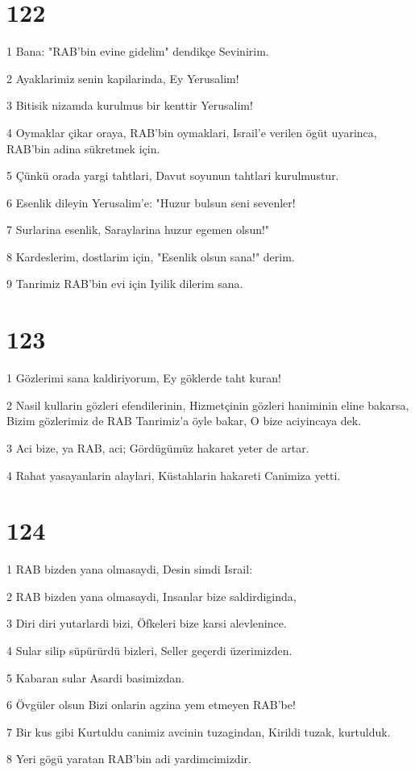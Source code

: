 \chapter{122}

\par 1 Bana: "RAB'bin evine gidelim" dendikçe Sevinirim.
\par 2 Ayaklarimiz senin kapilarinda, Ey Yerusalim!
\par 3 Bitisik nizamda kurulmus bir kenttir Yerusalim!
\par 4 Oymaklar çikar oraya, RAB'bin oymaklari, Israil'e verilen ögüt uyarinca, RAB'bin adina sükretmek için.
\par 5 Çünkü orada yargi tahtlari, Davut soyunun tahtlari kurulmustur.
\par 6 Esenlik dileyin Yerusalim'e: "Huzur bulsun seni sevenler!
\par 7 Surlarina esenlik, Saraylarina huzur egemen olsun!"
\par 8 Kardeslerim, dostlarim için, "Esenlik olsun sana!" derim.
\par 9 Tanrimiz RAB'bin evi için Iyilik dilerim sana.

\chapter{123}

\par 1 Gözlerimi sana kaldiriyorum, Ey göklerde taht kuran!
\par 2 Nasil kullarin gözleri efendilerinin, Hizmetçinin gözleri haniminin eline bakarsa, Bizim gözlerimiz de RAB Tanrimiz'a öyle bakar, O bize aciyincaya dek.
\par 3 Aci bize, ya RAB, aci; Gördügümüz hakaret yeter de artar.
\par 4 Rahat yasayanlarin alaylari, Küstahlarin hakareti Canimiza yetti.

\chapter{124}

\par 1 RAB bizden yana olmasaydi, Desin simdi Israil:
\par 2 RAB bizden yana olmasaydi, Insanlar bize saldirdiginda,
\par 3 Diri diri yutarlardi bizi, Öfkeleri bize karsi alevlenince.
\par 4 Sular silip süpürürdü bizleri, Seller geçerdi üzerimizden.
\par 5 Kabaran sular Asardi basimizdan.
\par 6 Övgüler olsun Bizi onlarin agzina yem etmeyen RAB'be!
\par 7 Bir kus gibi Kurtuldu canimiz avcinin tuzagindan, Kirildi tuzak, kurtulduk.
\par 8 Yeri gögü yaratan RAB'bin adi yardimcimizdir.

